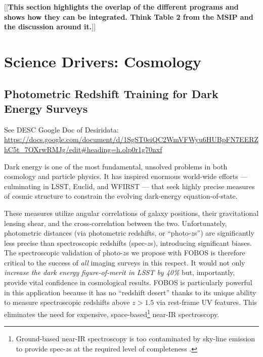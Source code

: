 \documentclass[11pt,a4paper,twoside,onecolumn,openany,final,oldfontcommands]{memoir}
\newcommand{\edit}[2][todo]{{\color{#1}[[{\bf #2}]]}}
\begin{document}
\edit{This section highlights the overlap of the different programs and shows how they can be integrated.  Think Table 2 from the MSIP and the discussion around it.}


\chapter{Science Drivers: Cosmology} \label{sci:cosmology}

\section{Photometric Redshift Training for Dark Energy Surveys}
\label{sci:photoz}

See DESC Google Doc of Desiridata: \url{https://docs.google.com/document/d/1SgST0eiQC2WmVFWyu6HUBpFN7EERZhC5t\_7OXrwRMJg/edit\#heading=h.olp0r1g70nxf}

Dark energy is one of the most fundamental, unsolved problems in both cosmology and particle physics.  It has inspired enormous world-wide efforts --- culminating in LSST, Euclid, and WFIRST --- that seek highly precise measures of cosmic structure to constrain the evolving dark-energy equation-of-state.

These measures utilize angular correlations of galaxy positions, their gravitational lensing shear, and the cross-correlation between the two. Unfortunately, photometric distances (via photometric redshifts, or ``photo-$z$s'') are significantly less precise than spectroscopic redshifts (spec-$z$s), introducing significant biases.  The spectroscopic validation of photo-$z$s we propose with FOBOS is therefore critical to the success of {\it all} imaging surveys in this respect. It would not only \emph{increase the dark energy figure-of-merit in LSST by 40\%} \citep{newman15} but, importantly, provide vital confidence in cosmological results.  FOBOS is particularly powerful in this application because it has no ``redshift desert'' thanks to its unique ability to measure spectroscopic redshifts above $z > 1.5$ via rest-frame UV features.  This eliminates the need for expensive, space-based\footnote{Ground-based near-IR spectroscopy is too contaminated by sky-line emission to provide spec-$z$s at the required level of completeness \citep{newman15}.} near-IR spectroscopy. 
\end{document}
